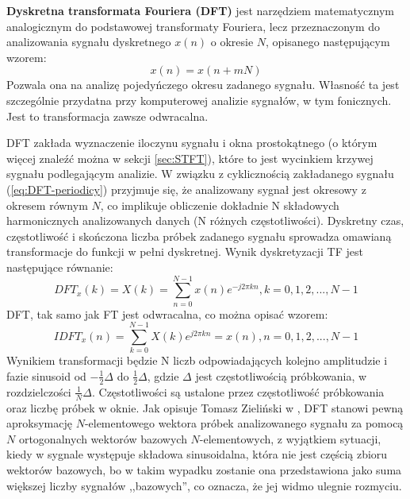 \documentclass[12pt,a4paper,twoside]{mwart}
\begin{document}
\textbf{Dyskretna transformata Fouriera (DFT)} jest narzędziem matematycznym analogicznym do podstawowej transformaty Fouriera, lecz przeznaczonym do analizowania sygnału dyskretnego $x(n)$ o okresie $N$, opisanego następującym wzorem:
\begin{equation} \label{eq:DFT-periodicy}
  x(n) = x(n + mN)
\end{equation}
Pozwala ona na analizę pojedyńczego okresu zadanego sygnału. Własność ta jest szczególnie przydatna przy komputerowej analizie sygnałów, w tym fonicznych. Jest to transformacja zawsze odwracalna. 

DFT zakłada wyznaczenie iloczynu sygnału i okna prostokątnego (o którym więcej znaleźć można w sekcji \ref{sec:STFT}), które to jest wycinkiem krzywej sygnału podlegającym analizie. W związku z cyklicznością zakładanego sygnału (\ref{eq:DFT-periodicy}) przyjmuje się, że analizowany sygnał jest okresowy z okresem równym $N$, co implikuje obliczenie dokładnie N składowych harmonicznych analizowanych danych (N różnych częstotliwości). Dyskretny czas, częstotliwość i skończona liczba próbek zadanego sygnału sprowadza omawianą transformacje do funkcji w pełni dyskretnej. Wynik dyskretyzacji TF jest następujące równanie:
\begin{equation} \label{eq:DFT}
  DFT_x(k) = X(k) = \sum_{n = 0}^{N-1} x(n)e^{-j{2 \pi}kn},  k = 0, 1, 2,..., N-1
\end{equation}
DFT, tak samo jak FT jest odwracalna, co można opisać wzorem:
\begin{equation} \label{eq:IDFT}
  IDFT_x(n) = \sum_{k = 0}^{N-1} X(k)e^{j2\pi kn} = x(n), n = 0, 1, 2,..., N-1
\end{equation}
Wynikiem transformacji będzie N liczb odpowiadających kolejno amplitudzie i fazie sinusoid od $- \frac{1}{2} \Delta $ do $\frac{1}{2} \Delta $, gdzie $\Delta$ jest częstotliwością próbkowania, w rozdzielczości $\frac{1}{N} \Delta$. Częstotliwości są ustalone przez częstotliwość próbkowania oraz liczbę próbek w oknie. Jak opisuje Tomasz Zieliński w \cite[198 - 200, 204-206]{CyfrowePrzetwarzanieSygnalowOdTeoriiDoZastosowan}, DFT stanowi pewną aproksymację $N$-elementowego wektora próbek analizowanego sygnału za pomocą $N$ ortogonalnych wektorów bazowych $N$-elementowych, z wyjątkiem sytuacji, kiedy w sygnale występuje składowa sinusoidalna, która nie jest częścią zbioru wektorów bazowych, bo w takim wypadku zostanie ona przedstawiona jako suma większej liczby sygnałów ,,bazowych'', co oznacza, że jej widmo ulegnie rozmyciu.
\end{document}
